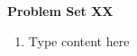 \documentclass[12pt]{article}
\begin{document}
	\begin{center}
		\textbf{Problem Set XX}
	\end{center}

	\begin{enumerate}
		\item Type content here
	\end{enumerate}
\end{document}
